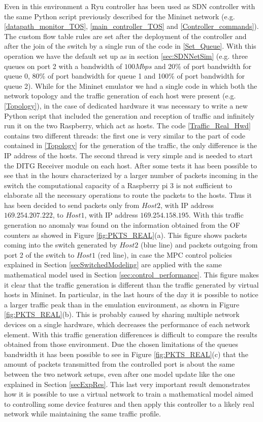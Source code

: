 Even in this environment a Ryu controller has been used as SDN controller with the same Python script previously described for the Mininet network (e.g. \ref{datapath_monitor_TOS}, \ref{main_controller_TOS} and \ref{Controller_commands}). The custom flow table rules are set after the deployment of the controller and after the join of the switch by a single run of the code in \ref{Set_Queue}. With this operation we have the default set up as in section \ref{sec:SDNNetSim} (e.g. three queues on port 2 with a bandwidth of $100Mbps$ and 20\% of port bandwidth for queue 0, 80\% of port bandwidth for queue 1 and 100\% of port bandwidth for queue 2). While for the Mininet emulator we had a single code in which both the network topology and the traffic generation of each host were present (e.g. \ref{Topology}), in the case of dedicated hardware it was necessary to write a new Python script that included the generation and reception of traffic and infinitely run it on the two Raspberry, which act as hosts. The code \ref{Traffic_Real_Hwd} contains two different threads: the first one is very similar to the part of code contained in \ref{Topology} for the generation of the traffic, the only difference is the IP address of the hosts. The second thread is very simple and is needed to start the DITG Receiver module on each host. After some tests it has been possible to see that in the hours characterized by a larger number of packets incoming in the switch the computational capacity of a Raspberry pi 3 is not sufficient to elaborate all the necessary operations to route the packets to the hosts. Thus it has been decided to send packets only from $Host 2$, with IP address $169.254.207.222$, to $Host 1$, with IP address $169.254.158.195$. With this traffic generation no anomaly was found on the information obtained from the OF counters as showed in Figure \ref{fig:PKTS_REAL}(a). This figure shows packets coming into the switch generated by $Host 2$ (blue line) and packets outgoing from port 2 of the switch to $Host 1$ (red line), in case the MPC control policies explained in Section \ref{secSwitchedModeling} are applied with the same mathematical model used in Section \ref{sec:control_performance}. This figure makes it clear that the traffic generation is different than the traffic generated by virtual hosts in Mininet. In particular, in the last hours of the day it is possible to notice a larger traffic peak than in the emulation environment, as shown in Figure \ref{fig:PKTS_REAL}(b). This is probably caused by sharing multiple network devices on a single hardware, which decreases the performance of each network element. With this traffic generation differences is difficult to compare the results obtained from those environment. Due the chosen limitations of the queues bandwidth it has been possible to see in Figure \ref{fig:PKTS_REAL}(c) that the amount of packets transmitted from the controlled port is about the same between the two network setups, even after one model update like the one explained in Section \ref{secExpRes}. This last very important result demonstrates how it is possible to use a virtual network to train a mathematical model aimed to controlling some device features and then apply this controller to a likely real network while maintaining the same traffic profile. 